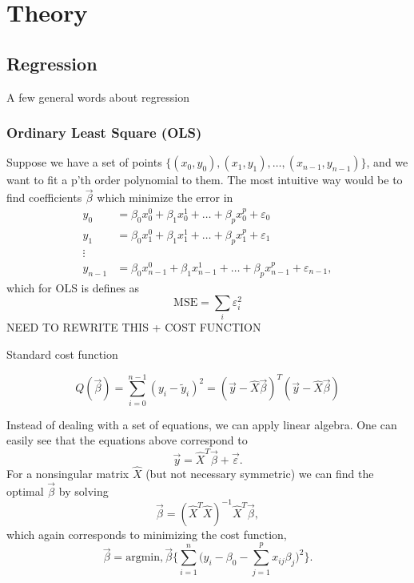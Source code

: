 \section{Theory} \label{sec:theory}

\subsection{Regression} \label{sec:regression}
A few general words about regression

\subsubsection{Ordinary Least Square (OLS)} \label{sec:OLS}
Suppose we have a set of points $\{(x_0, y_0), (x_1, y_1),\hdots, (x_{n-1}, y_{n-1})\}$, and we want to fit a p'th order polynomial to them. The most intuitive way would be to find coefficients $\vec{\beta}$ which minimize the error in
\begin{align*}
y_0&=\beta_0x_0^0+\beta_1x_0^1+\hdots+\beta_px_0^p+\varepsilon_0\\
y_1&=\beta_0x_1^0+\beta_1x_1^1+\hdots+\beta_px_1^p+\varepsilon_1\\
\vdots\\
y_{n-1}&=\beta_0x_{n-1}^0+\beta_1x_{n-1}^1+\hdots+\beta_px_{n-1}^p+\varepsilon_{n-1},
\end{align*}
which for OLS is defines as
\begin{equation}
\text{MSE}=\sum_i\varepsilon_i^2
\end{equation}
NEED TO REWRITE THIS + COST FUNCTION

Standard cost function

\begin{equation}
Q(\vec{\beta})=\sum_{i=0}^{n-1}(y_i-\tilde{y}_i)^2=(\vec{y}-\hat{X}\vec{\beta})^T(\vec{y}-\hat{X}\vec{\beta})
\end{equation}

Instead of dealing with a set of equations, we can apply linear algebra. One can easily see that the equations above correspond to
\begin{equation}
\vec{y}=\hat{X}^T\vec{\beta}+\vec{\varepsilon}.
\end{equation}
For a nonsingular matrix $\hat{X}$ (but not necessary symmetric) we can find the optimal $\vec{\beta}$ by solving
\begin{equation}
\vec{\beta}=(\hat{X}^T\hat{X})^{-1}\hat{X}^T\vec{\beta},
\end{equation}
which again corresponds to minimizing the cost function,
\begin{equation}
\vec{\beta}=\text{argmin},\vec{\beta}\bigg\{\sum_{i=1}^{n}\Big(y_i-\beta_0-\sum_{j=1}^px_{ij}\beta_j\Big)^2\bigg\}.
\end{equation}

